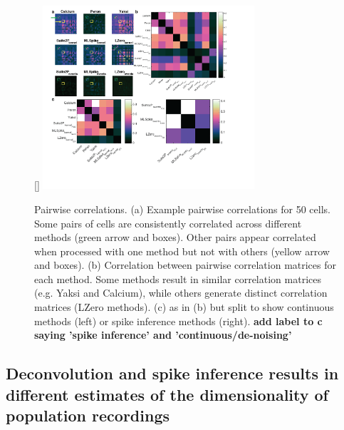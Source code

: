 \documentclass[a4paper,10pt,twocolumn]{article}
\begin{document}
\begin{figure}
[\FBwidth]
{\includegraphics[trim={10 35 35 5}, clip, width=0.7\textwidth]{full_figs/why_deconvolve_F8.png}}
{\caption{\label{fig:cxy_comparison}Pairwise correlations. (a) Example pairwise correlations for 50 cells. Some pairs of cells are consistently correlated across different methods (green arrow and boxes). Other pairs appear correlated when processed with one method but not with others (yellow arrow and boxes). (b) Correlation between pairwise correlation matrices for each method. Some methods result in similar correlation matrices (e.g. Yaksi and Calcium), while others generate distinct correlation matrices (LZero methods). (c) as in (b) but split to show continuous methods (left) or spike inference methods (right). \textbf{add label to c saying 'spike inference' and 'continuous/de-noising'}}}
\end{figure}


\subsection{Deconvolution and spike inference results in different estimates of the dimensionality of population recordings}
\end{document}
